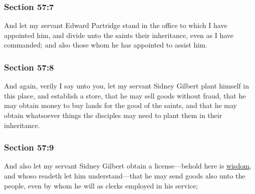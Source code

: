 	\subsubsection{Section 57:7} %
		\label{DC57-7}

		And let my servant Edward Partridge stand in the office to which I have appointed him, and divide unto the saints their inheritance, even as I have commanded; and also those whom he has appointed to assist him.


	\subsubsection{Section 57:8} %
		\label{DC57-8}

		And again, verily I say unto you, let my servant Sidney Gilbert plant himself in this place, and establish a store, that he may sell goods without fraud, that he may obtain money to buy lands for the good of the saints, and that he may obtain whatsoever things the disciples may need to plant them in their inheritance.


	\subsubsection{Section 57:9} %
		\label{DC57-9}

		And also let my servant Sidney Gilbert obtain a license---behold here is \hyperref[WISDOM]{wisdom}, and whoso readeth let him understand---that he may send goods also unto the people, even by whom he will as clerks employed in his service;

